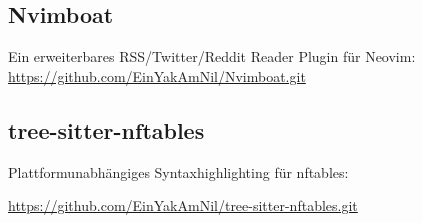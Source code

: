 \documentclass{article}
\begin{document}
\subsection{Nvimboat}
Ein erweiterbares RSS/Twitter/Reddit Reader Plugin für Neovim: \href{https://github.com/EinYakAmNil/Nvimboat.git}{https://github.com/EinYakAmNil/Nvimboat.git}

\subsection{tree-sitter-nftables}
Plattformunabhängiges Syntaxhighlighting für nftables:

\href{https://github.com/EinYakAmNil/tree-sitter-nftables.git}{https://github.com/EinYakAmNil/tree-sitter-nftables.git}
\end{document}

